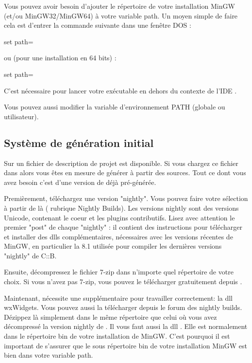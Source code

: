 Vous pouvez avoir besoin d'ajouter le répertoire  de votre installation MinGW (et/ou MinGW32/MinGW64) à votre variable path. Un moyen simple de faire cela est d'entrer la commande suivante dans une fenêtre DOS :

\begin{cmd}
set path=%
\end{cmd}
ou (pour une installation en 64 bits) :
\begin{cmd}
set path=%
\end{cmd}

C'est nécessaire pour lancer votre exécutable en dehors du contexte de l'IDE \codeblocks.

Vous pouvez aussi modifier la variable d'environnement PATH (globale ou utilisateur).


\subsection{Système de génération initial}

Sur \cite{url:cb} un fichier de description de projet  est disponible. Si vous chargez ce fichier dans \codeblocks alors vous êtes en mesure de générer \codeblocks à partir des sources. Tout ce dont vous avez besoin c'est d'une version de \codeblocks déjà pré-générée.

Premièrement, téléchargez une version "nightly". Vous pouvez faire votre sélection à partir de là (\cite{url:cbforum} rubrique Nightly Builds). Les versions nightly sont des versions Unicode, contenant le coeur et les plugins contributifs. Lisez avec attention le premier "post" de chaque "nightly" : il contient des instructions pour télécharger et installer des dlls complémentaires, nécessaires avec les versions récentes de MinGW, en particulier la 8.1 utilisée pour compiler les dernières versions "nightly" de C::B.

Ensuite, décompressez le fichier 7-zip dans n'importe quel répertoire de votre choix. Si vous n'avez pas 7-zip, vous pouvez le télécharger gratuitement depuis \cite{url:zip}.

Maintenant, \codeblocks nécessite une  supplémentaire pour travailler correctement: la dll wxWidgets. Vous pouvez aussi la télécharger depuis le forum des nightly builds. Dézippez là simplement dans le même répertoire que celui où vous avez décompressé la version nightly de \codeblocks . Il vous faut aussi la dll . Elle est normalement dans le répertoire bin de votre installation de MinGW. C'est pourquoi il est important de s'assurer que le sous répertoire bin de votre installation MinGW est bien dans votre variable path.

